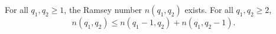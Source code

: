 For all $q_1, q_2 \geq 1$, the Ramsey number $n(q_1, q_2)$ exists. For all $q_1, q_2 \geq 2$,
$$n(q_1, q_2) \leq n(q_1 - 1, q_2) + n(q_1, q_2 - 1).$$
